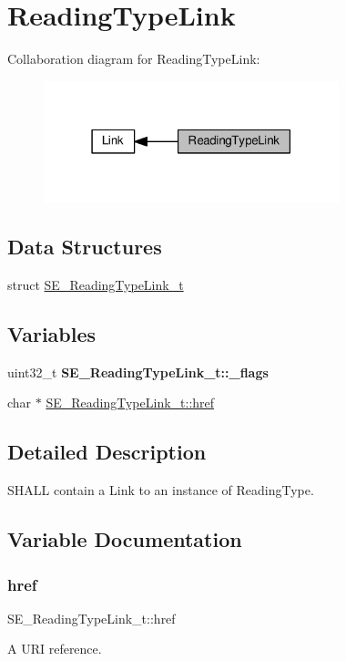 \hypertarget{group__ReadingTypeLink}{}\section{Reading\+Type\+Link}
\label{group__ReadingTypeLink}
Collaboration diagram for Reading\+Type\+Link\+:\nopagebreak
\begin{figure}[H]
\begin{center}
\leavevmode
\includegraphics[width=243pt]{group__ReadingTypeLink}
\end{center}
\end{figure}
\subsection*{Data Structures}
\begin{DoxyCompactItemize}
\item 
struct \hyperlink{structSE__ReadingTypeLink__t}{S\+E\+\_\+\+Reading\+Type\+Link\+\_\+t}
\end{DoxyCompactItemize}
\subsection*{Variables}
\begin{DoxyCompactItemize}
\item 
\mbox{\label{group__ReadingTypeLink_ga68528b648ddc527e1388306f4517b0ff}} 
uint32\+\_\+t {\bfseries S\+E\+\_\+\+Reading\+Type\+Link\+\_\+t\+::\+\_\+flags}
\item 
char $\ast$ \hyperlink{group__ReadingTypeLink_gadbfb1fd5eb21fc308fdf525851fe402c}{S\+E\+\_\+\+Reading\+Type\+Link\+\_\+t\+::href}
\end{DoxyCompactItemize}


\subsection{Detailed Description}
S\+H\+A\+LL contain a Link to an instance of Reading\+Type. 

\subsection{Variable Documentation}
\mbox{\label{group__ReadingTypeLink_gadbfb1fd5eb21fc308fdf525851fe402c}} 
\subsubsection{\texorpdfstring{href}{href}}
{\footnotesize\ttfamily S\+E\+\_\+\+Reading\+Type\+Link\+\_\+t\+::href}

A U\+RI reference. 